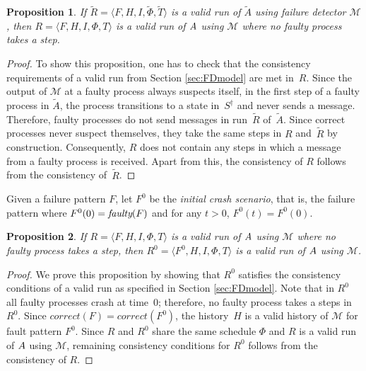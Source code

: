 \documentclass[11pt]{article}
\newtheorem{proposition}{Proposition}[section]
\newcommand{\ident}[1]{\textit{#1}\rule{0cm}{1ex}}
\newcommand{\emn}[1]{{\em #1\/}}
\newcommand{\MFD}{\ensuremath{\mathcal{M}}}
\newcommand{\TrAlg}{\widetilde{A}}
\begin{document}
\begin{proposition}\label{prop:RvalidMFDrun}
If $\widetilde{R}=\langle F, H, I, \widetilde{\Phi}, \widetilde{T}
     \rangle$ is a valid run of $\TrAlg$ using failure detector
     $\MFD$, then $R=\langle F, H, I, \Phi, T \rangle$ is a valid run
     of $A$ using $\MFD$ where no faulty process takes a step.
\end{proposition}
\begin{proof}
To show this proposition, one has to check that the consistency
     requirements of a valid run from Section \ref{sec:FDmodel} are
     met in~$R$.
Since the output of $\MFD$ at a faulty process always suspects itself,
     in the first step of a faulty process in $\TrAlg$, the process
     transitions to a state in~$S^\dagger$ and never sends a message.
Therefore, faulty processes do not send messages  in
     run~$\widetilde{R}$ of~$\TrAlg$.
Since correct processes never suspect themselves, they take the same
     steps in $R$ and~$\widetilde{R}$ by construction.
Consequently, $R$ does not contain any steps in which a message from a
     faulty process is received.
Apart from this, the consistency of $R$ follows from the consistency
     of~$\widetilde{R}$.
\end{proof}

Given a failure pattern $F$, let $F^0$ be the \emn{initial crash
     scenario}, that is, the failure pattern where  $F^0(0) =
     \ident{faulty}(F)$ and for any $t>0$, $F^0(t)= F^0(0)$.

\begin{proposition}\label{prop:R0validMFDrun}
If $R=\langle F, H, I, \Phi, T \rangle$ is a valid run of $A$ using
     $\MFD$ where no faulty process takes a step, then $R^0=\langle
     F^0, H, I, \Phi, T \rangle$ is a valid run of $A$ using
     $\MFD$.
\end{proposition}
\begin{proof}
We prove this proposition by showing that $R^0$ satisfies the
     consistency conditions of a valid run as specified in Section
     \ref{sec:FDmodel}.
Note that in $R^0$ all faulty processes crash at time~$0$; therefore,
     no faulty process takes a steps in $R^0$.
Since $correct(F)=correct(F^0)$, the history~$H$ is a valid history of
     $\MFD$ for fault pattern $F^0$.
Since $R$ and $R^0$ share the same schedule $\Phi$ and $R$ is a valid
     run of $A$ using $\MFD$, remaining consistency conditions for
     $R^0$ follows from the consistency of $R$.
\end{proof}
\end{document}
